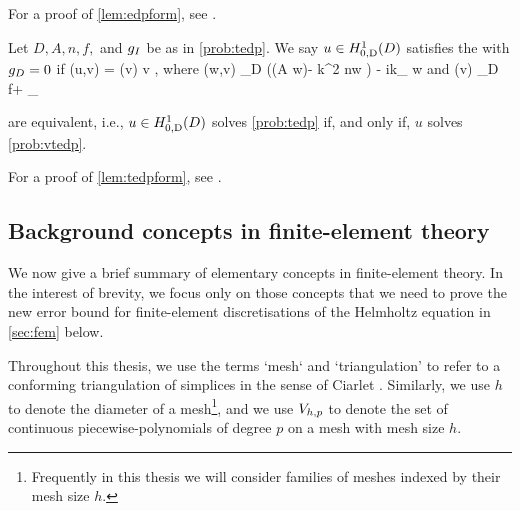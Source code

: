 For a proof of \cref{lem:edpform}, see \cite[Lemma 3.3]{GrPeSp:19}.

\bprob[Variational formulation of TEDP when $\gD = 0$]\label{prob:vtedp}
Let $D, A, n, f,$ and $g_{I}$ be as in \cref{prob:tedp}. We say $u \in \HozDD$ satisfies the  with $\gD = 0$ if
\beq\label{eq:vtedp}
\aT(u,v) = \FT(v) \tfa v \in \HozDD,
\eeq
where
\beq\label{eq:aT}
\aT(w,v) \de \int_{D} \big(\mleft(A \grad w\mright)\cdot\grad \vbar - k^2 n\minispace w \vbar\big) - ik\int_{\GI} \trGI w\minispace\trGI \vbar
\eeq
and
\beqs
\FT(v) \de \int_{D} f\minispace\vbar + \int_{\GI} \gI \minispace\trGI \vbar
\eeqs
\eprob

\label{lem:tedpform}
 are equivalent, i.e., $u \in \HozDD$ solves \cref{prob:tedp} if, and only if, $u$ solves \cref{prob:vtedp}.
\ele

For a proof of \cref{lem:tedpform}, see \cite[Lemma A.7]{GrPeSp:19}.
  
\subsection{Background concepts in finite-element theory}\label{sec:fetheory}

We now give a brief summary of elementary concepts in finite-element theory. In the interest of brevity, we focus only on those concepts that we need to prove the new error bound for finite-element discretisations of the Helmholtz equation in \cref{sec:fem} below.

Throughout this thesis, we use the terms `mesh` and `triangulation' to refer to a conforming triangulation of simplices in the sense of Ciarlet \cite[Paragraphs (FEM1) p. 61 and ($\cT_{h}$5) p. 71]{Ci:91}. Similarly, we use $h$ to denote the diameter of a mesh\footnote{Frequently in this thesis we will consider families of meshes indexed by their mesh size $h$.}, and we use $V_{h,p}$ to denote the set of continuous piecewise-polynomials of degree $p$ on a mesh with mesh size $h$.


